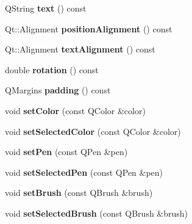 \begin{DoxyCompactItemize}
Q\+String {\bfseries text} () const
\item 
\mbox{\label{class_q_c_p_item_text_a0d946dca3008d353afd04b4337739199}} 
Qt\+::\+Alignment {\bfseries position\+Alignment} () const
\item 
\mbox{\label{class_q_c_p_item_text_a9af3198d46551e1cc7703f02c95ddfe5}} 
Qt\+::\+Alignment {\bfseries text\+Alignment} () const
\item 
\mbox{\label{class_q_c_p_item_text_a035962b4ed23ff0a89e6a8b46fa18bf1}} 
double {\bfseries rotation} () const
\item 
\mbox{\label{class_q_c_p_item_text_a5a598618350b40446d031fa9dc15fba7}} 
Q\+Margins {\bfseries padding} () const
\item 
\mbox{\label{class_q_c_p_item_text_aa51efc0841fe52da9eaf8aff6fc8a8b2}} 
void {\bfseries set\+Color} (const Q\+Color \&color)
\item 
\mbox{\label{class_q_c_p_item_text_ae7ba0bdb75c897b028388e45bfd435fa}} 
void {\bfseries set\+Selected\+Color} (const Q\+Color \&color)
\item 
\mbox{\label{class_q_c_p_item_text_a9b9ec6eea0eb0603977ff84d4c78d0a3}} 
void {\bfseries set\+Pen} (const Q\+Pen \&pen)
\item 
\mbox{\label{class_q_c_p_item_text_a291febe586f0da3f1c392e77bef4aa20}} 
void {\bfseries set\+Selected\+Pen} (const Q\+Pen \&pen)
\item 
\mbox{\label{class_q_c_p_item_text_a1c7e131516df2ed8d941ef31240ded8e}} 
void {\bfseries set\+Brush} (const Q\+Brush \&brush)
\item 
\mbox{\label{class_q_c_p_item_text_a6b8377eeb2af75eb9528422671ac16cb}} 
void {\bfseries set\+Selected\+Brush} (const Q\+Brush \&brush)
\item 
\mbox{\label{class_q_c_p_item_text_a94ad60ebe04f5c07c35e7c2029e96b1f}} 

\end{DoxyCompactItemize}
